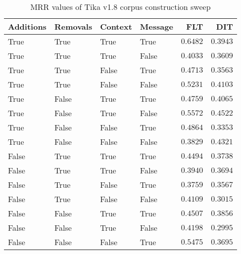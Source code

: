 
\begin{table}
\begin{spacing}{1.2}
\centering
\caption{MRR values of Tika v1.8 corpus construction sweep}
\label{table:tika_corpus_sweep}
\vspace{0.2em}
\begin{tabular}{llll|rr}
\toprule
Additions & Removals & Context & Message & FLT &        DIT \\
\midrule
     True &     True &    True &    True &    $\bm{0.6482}$ &      $0.3943$ \\
     True &     True &    True &   False &         $0.4033$ &      $0.3609$ \\
     True &     True &   False &    True &         $0.4713$ &      $0.3563$ \\
     True &     True &   False &   False &         $0.5231$ &      $0.4103$ \\
     True &    False &    True &    True &         $0.4759$ &      $0.4065$ \\
     True &    False &    True &   False &         $0.5572$ & $\bm{0.4522}$ \\
     True &    False &   False &    True &         $0.4864$ &      $0.3353$ \\
     True &    False &   False &   False &         $0.3829$ &      $0.4321$ \\
    False &     True &    True &    True &         $0.4494$ &      $0.3738$ \\
    False &     True &    True &   False &         $0.3940$ &      $0.3694$ \\
    False &     True &   False &    True &         $0.3759$ &      $0.3567$ \\
    False &     True &   False &   False &         $0.4109$ &      $0.3015$ \\
    False &    False &    True &    True &         $0.4507$ &      $0.3856$ \\
    False &    False &    True &   False &         $0.4198$ &      $0.2995$ \\
    False &    False &   False &    True &         $0.5475$ &      $0.3695$ \\
\bottomrule
\end{tabular}

\end{spacing}
\end{table}
